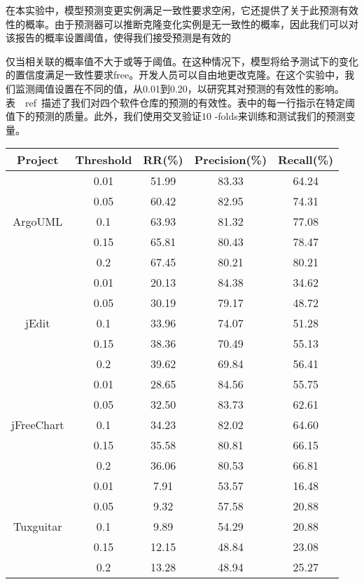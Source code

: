 在本实验中，模型预测变更实例满足一致性要求空闲，它还提供了关于此预测有效性的概率。由于预测器可以推断克隆变化实例是无一致性的概率，因此我们可以对该报告的概率设置阈值，使得我们接受预测是有效的{仅当相关联的概率值不大于或等于阈值。在这种情况下，模型将给予测试下的变化的置信度满足一致性要求free。开发人员可以自由地更改克隆。在这个实验中，我们监测阈值设置在不同的值，从0.01到0.20，以研究其对预测的有效性的影响。表~\ ref{}~描述了我们对四个软件仓库的预测的有效性。表中的每一行指示在特定阈值下的预测的质量。此外，我们使用交叉验证$ 10 $ -folds来训练和测试我们的预测变量。

\begin{table}[htbp]
\vspace{0.5em}\centering\wuhao
\begin{tabular}{ccccc}
\toprule[1.5pt]
\textbf{Project}&\textbf{Threshold}&\textbf{RR(\%)}&\textbf{Precision(\%)}&\textbf{Recall(\%)}\\

\midrule[1pt]
\hline
\multirow{5}{*}{ArgoUML}
&0.01&	51.99&	83.33&	64.24\\
&0.05&	60.42&	82.95&	74.31\\
&0.1&	63.93&	81.32&	77.08\\
&0.15&	65.81&	80.43&	78.47\\
&0.2&	67.45&	80.21&	80.21\\
\hline
\multirow{5}{*}{jEdit}
&0.01&	20.13&	84.38&	34.62\\
&0.05&	30.19&	79.17&	48.72\\
&0.1&	33.96&	74.07&	51.28\\
&0.15&	38.36&	70.49&	55.13\\
&0.2&	39.62&	69.84&	56.41\\
\hline
\multirow{5}{*}{jFreeChart}
&0.01&	28.65&	84.56&	55.75\\
&0.05&	32.50&	83.73&	62.61\\
&0.1&	34.23&	82.02&	64.60\\
&0.15&	35.58&	80.81&	66.15\\
&0.2&	36.06&	80.53&	66.81\\
\hline
\multirow{5}{*}{Tuxguitar}
&0.01&	7.91&	53.57&	16.48\\
&0.05&	9.32&	57.58&	20.88\\
&0.1&	9.89&	54.29&	20.88\\
&0.15&	12.15&	48.84&	23.08\\
&0.2&	13.28&	48.94&	25.27\\
\hline
\bottomrule[1.5pt]
\end{tabular}
\end{table}

}
